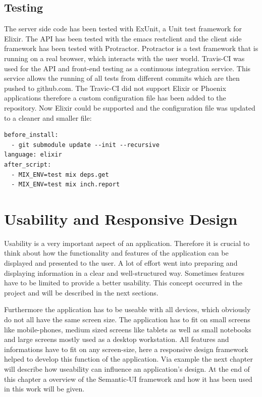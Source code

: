 \section{Testing}
The server side code has been tested with ExUnit, a Unit test framework for Elixir. The API has been tested with the emacs restclient and the client side framework has been tested with Protractor. 
Protractor is a test framework that is running on a real browser, which interacts with the user world.
\textcolor{newcode}{Travis-CI was used for the API and front-end testing as a continuous integration service. This service allows the running of all tests from different commits which are then pushed to github.com. The Travic-CI did not support Elixir or Phoenix applications therefore a custom configuration file has been added to the repository. Now Elixir could be supported and the configuration file was updated to a cleaner and smaller file:}

\begin{verbatim}
before_install:
  - git submodule update --init --recursive
language: elixir
after_script:
  - MIX_ENV=test mix deps.get
  - MIX_ENV=test mix inch.report
\end{verbatim}

\chapter{Usability and Responsive Design}
Usability is a very important aspect of an application. Therefore it is crucial to think about how the functionality and features of the application can be displayed and presented to the user. A lot of effort went into preparing and displaying information in a clear and well-structured way. Sometimes features have to be limited to provide a better usability. This concept occurred in the project and will be described in the next sections. 

Furthermore the application has to be useable with all devices, which obviously do not all have the same screen size. The application has to fit on small screens like mobile-phones, medium sized screens like tablets as well as small notebooks and large screens mostly used as a desktop workstation. All features and informations have to fit on any screen-size, here a responsive design framework helped to develop this function of the application. Via example the next chapter will describe how useability can influence an application's design. At the end of this chapter a overview of the Semantic-UI framework and how it has been used in this work will be given.

